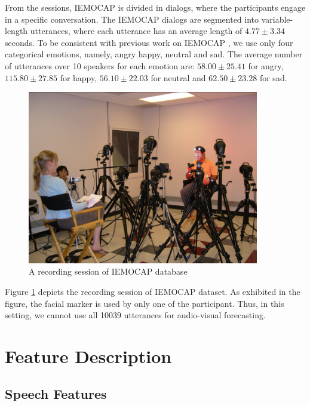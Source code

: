 From the sessions, IEMOCAP is divided in dialogs, where the participants engage in a specific conversation. The IEMOCAP dialogs are segmented into variable-length utterances, where each utterance has an average length of $4.77\pm3.34$ seconds. To be consistent with previous work on IEMOCAP \cite{Meta, Kim2016EmotionSD}, we use only four categorical emotions, namely, angry happy, neutral and sad. The average number of utterances over 10 speakers for each emotion are: $58.00\pm25.41$ for angry, $115.80\pm27.85$ for happy, $56.10\pm22.03$ for neutral and $62.50\pm23.28$ for sad.

\begin{figure}
\centering
   \includegraphics[width=0.9\textwidth]{Chapters/IEMOCAP_record.png}
\caption[A recording session of IEMOCAP database]{A recording session of IEMOCAP database}
\label{fig:data_recording}
\end{figure}

Figure \ref{fig:data_recording} depicts the recording session of IEMOCAP dataset. As exhibited in the figure, the facial marker is used by only one of the participant. Thus, in this setting, we cannot use all 10039 utterances for audio-visual forecasting.  

\chapter{Feature Description} %
\label{Chapter2} %
\section{Speech Features}

